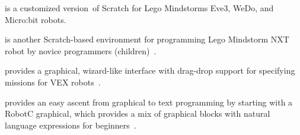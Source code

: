 \parhead{\scratchev} is a customized version\,\cite{scratchEv3} of Scratch for Lego Mindstorms Eve3, WeDo, and Micro:bit robots. %

\parhead{\enchanting} is another Scratch-based environment for programming Lego Mindstorm NXT robot by novice programmers (children)%
\,\cite{enchanting}.%

\parhead{\easyc} provides a graphical, wizard-like interface with drag-drop support for specifying missions for VEX robots%
\,\cite{EasyC}. %


\parhead{\robotc} provides an easy ascent from graphical to text programming  by starting with a RobotC graphical, which provides a mix of graphical blocks with natural language expressions for beginners%
\,\cite{robotc}.
